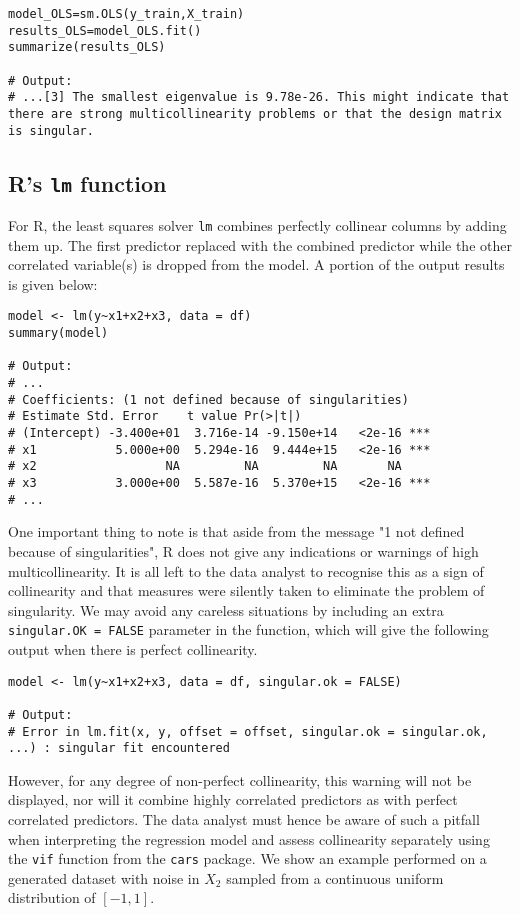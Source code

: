 \documentclass[12pt]{article}
\begin{document}
	\begin{lstlisting}
model_OLS=sm.OLS(y_train,X_train)
results_OLS=model_OLS.fit()
summarize(results_OLS)

# Output:
# ...[3] The smallest eigenvalue is 9.78e-26. This might indicate that there are strong multicollinearity problems or that the design matrix is singular.
	\end{lstlisting}
	\pagebreak
	\subsection{R's \texttt{lm} function}
	For R, the least squares solver \texttt{lm} combines perfectly collinear columns by adding them up. The first predictor replaced with the combined predictor while the other correlated variable(s) is dropped from the model. A portion of the output results is given below:\\
	\begin{lstlisting}
model <- lm(y~x1+x2+x3, data = df)
summary(model)

# Output: 
# ...
# Coefficients: (1 not defined because of singularities)
# Estimate Std. Error    t value Pr(>|t|)    
# (Intercept) -3.400e+01  3.716e-14 -9.150e+14   <2e-16 ***
# x1           5.000e+00  5.294e-16  9.444e+15   <2e-16 ***
# x2                  NA         NA         NA       NA    
# x3           3.000e+00  5.587e-16  5.370e+15   <2e-16 ***
# ...
	\end{lstlisting}
	\vspace{2mm}
	
	One important thing to note is that aside from the message "1 not defined because of singularities", R does not give any indications or warnings of high multicollinearity. It is all left to the data analyst to recognise this as a sign of collinearity and that measures were silently taken to eliminate the problem of singularity. We may avoid any careless situations by including an extra \texttt{singular.OK = FALSE} parameter in the function, which will give the following output when there is perfect collinearity.\\
	\begin{lstlisting}
model <- lm(y~x1+x2+x3, data = df, singular.ok = FALSE)

# Output: 
# Error in lm.fit(x, y, offset = offset, singular.ok = singular.ok, ...) : singular fit encountered
	\end{lstlisting}
	\vspace{2mm}
	
	However, for any degree of non-perfect collinearity, this warning will not be displayed, nor will it combine highly correlated predictors as with perfect correlated predictors. The data analyst must hence be aware of such a pitfall when interpreting the regression model and assess collinearity separately using the \texttt{vif} function from the \texttt{cars} package. We show an example performed on a generated dataset with noise in $X_2$ sampled from a continuous uniform distribution of $[-1,1]$.\\
	\pagebreak
	
\end{document}
